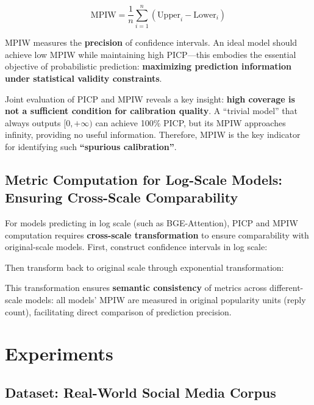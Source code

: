 \documentclass[10pt]{article}
\begin{document}
\begin{equation}
\text{MPIW} = \frac{1}{n} \sum_{i=1}^{n} (\text{Upper}_i - \text{Lower}_i)
\end{equation}

MPIW measures the \textbf{precision} of confidence intervals. An ideal model should achieve low MPIW while maintaining high PICP---this embodies the essential objective of probabilistic prediction: \textbf{maximizing prediction information under statistical validity constraints}.

Joint evaluation of PICP and MPIW reveals a key insight: \textbf{high coverage is not a sufficient condition for calibration quality}. A ``trivial model'' that always outputs $[0, +\infty)$ can achieve 100\% PICP, but its MPIW approaches infinity, providing no useful information. Therefore, MPIW is the key indicator for identifying such \textbf{``spurious calibration''}.

\subsection{Metric Computation for Log-Scale Models: Ensuring Cross-Scale Comparability}

For models predicting in log scale (such as BGE-Attention), PICP and MPIW computation requires \textbf{cross-scale transformation} to ensure comparability with original-scale models. First, construct confidence intervals in log scale:
\begin{equation}
[\log(\mu+c) - 1.96\sigma, \log(\mu+c) + 1.96\sigma]
\end{equation}

Then transform back to original scale through exponential transformation:
\begin{equation}
[\exp(\text{Lower}_{\log}) - c, \exp(\text{Upper}_{\log}) - c]
\end{equation}

This transformation ensures \textbf{semantic consistency} of metrics across different-scale models: all models' MPIW are measured in original popularity units (reply count), facilitating direct comparison of prediction precision.

\section{Experiments}

\subsection{Dataset: Real-World Social Media Corpus}
\end{document}
